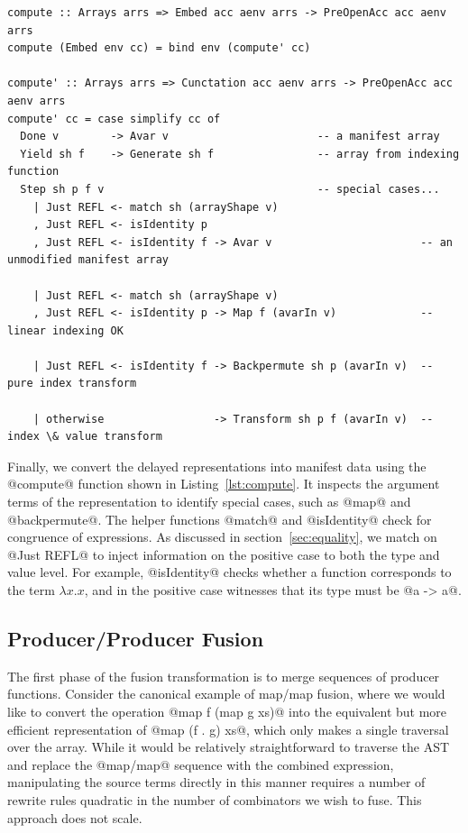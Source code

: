 \begin{lstlisting}[style=haskell_float
    ,label=lst:compute
    ,caption={Computing the delayed representation to a manifest array}]
compute :: Arrays arrs => Embed acc aenv arrs -> PreOpenAcc acc aenv arrs
compute (Embed env cc) = bind env (compute' cc)

compute' :: Arrays arrs => Cunctation acc aenv arrs -> PreOpenAcc acc aenv arrs
compute' cc = case simplify cc of
  Done v        -> Avar v                       -- a manifest array
  Yield sh f    -> Generate sh f                -- array from indexing function
  Step sh p f v                                 -- special cases...
    | Just REFL <- match sh (arrayShape v)
    , Just REFL <- isIdentity p
    , Just REFL <- isIdentity f -> Avar v                       -- an unmodified manifest array

    | Just REFL <- match sh (arrayShape v)
    , Just REFL <- isIdentity p -> Map f (avarIn v)             -- linear indexing OK

    | Just REFL <- isIdentity f -> Backpermute sh p (avarIn v)  -- pure index transform

    | otherwise                 -> Transform sh p f (avarIn v)  -- index \& value transform
\end{lstlisting}

Finally, we convert the delayed representations into manifest data using the
@compute@ function shown in Listing~\ref{lst:compute}. It inspects the argument
terms of the representation to identify special cases, such as @map@ and
@backpermute@.
%
The helper functions @match@ and @isIdentity@ check for congruence of
expressions. As discussed in section~\ref{sec:equality}, we match on @Just REFL@
to inject information on the positive case to both the type and value level. For
example, @isIdentity@ checks whether a function corresponds to the term $\lambda
x.x$, and in the positive case witnesses that its type must be @a -> a@.

\subsection{Producer/Producer Fusion}
\label{sec:producer_producer_fusion}

The first phase of the fusion transformation is to merge sequences of producer
functions. Consider the canonical example of map/map fusion, where we would like
to convert the operation @map f (map g xs)@ into the equivalent but more
efficient representation of @map (f . g) xs@, which only makes a single
traversal over the array. While it would be relatively straightforward to
traverse the AST and replace the @map/map@ sequence with the combined
expression, manipulating the source terms directly in this manner requires a
number of rewrite rules quadratic in the number of combinators we wish to fuse.
This approach does not scale.

